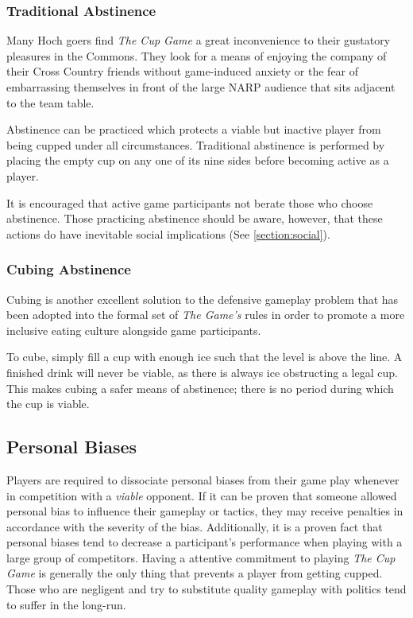 \documentclass[12pt]{IEEEconf}
\begin{document}
\subsubsection{Traditional Abstinence} Many Hoch goers find \textit{The Cup Game} a great inconvenience to their gustatory pleasures in the Commons. They look for a means of enjoying the company of their Cross Country friends without game-induced anxiety or the fear of embarrassing themselves in front of the large NARP audience that sits adjacent to the team table.

Abstinence can be practiced which protects a viable but inactive player from being cupped under all circumstances. Traditional abstinence is performed by placing the empty cup on any one of its nine sides before becoming active as a player.

It is encouraged that active game participants not berate those who choose abstinence. Those practicing abstinence should be aware, however, that these actions do have inevitable social implications (See \ref{section:social}).

\subsubsection{Cubing Abstinence}
Cubing is another excellent solution to the defensive gameplay problem that has been adopted into the formal set of \textit{The Game's} rules in order to promote a more inclusive eating culture alongside game participants.

To cube, simply fill a cup with enough ice such that the level is above the line. A finished drink will never be viable, as there is always ice obstructing a legal cup. This makes cubing a safer means of abstinence; there is no period during which the cup is viable.

\subsection{Personal Biases} 
Players are required to dissociate personal biases from their game play whenever in competition with a \textit{viable} opponent. If it can be proven that someone allowed personal bias to influence their gameplay or tactics, they may receive penalties in accordance with the severity of the bias. Additionally, it is a proven fact that personal biases tend to decrease a participant's performance when playing with a large group of competitors. Having a attentive commitment to playing \textit{The Cup Game} is generally the only thing that prevents a player from getting cupped. Those who are negligent and try to substitute quality gameplay with politics tend to suffer in the long-run.
\end{document}
